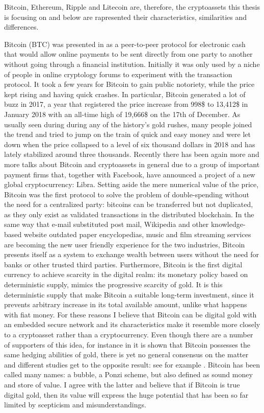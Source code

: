 Bitcoin, Ethereum, Ripple and Litecoin are, therefore, the cryptoassets this thesis is focusing on and below are rapresented their characteristics, similarities and differences.
\bigskip

Bitcoin (BTC) was presented in \citep{BTC2008} as a peer-to-peer protocol for electronic cash that would allow online payments to be sent directly from one party to another without going through a financial institution. Initially it was only used by a niche of people in online cryptology forums to experiment with the transaction protocol. It took a few years for Bitcoin to gain public notoriety, while the price kept rising and having quick crashes.
In particular, Bitcoin generated a lot of buzz in 2017, a year that registered the price increase from 998\$ to 13,412\$ in January 2018 with an all-time high of 19,666\$ on the 17th of December. As usually seen during during any of the history's gold rushes, many people joined the trend and tried to jump on the train of quick and easy money and were let down when the price collapsed to a level of six thousand dollars in 2018 and has lately stabilized around three thousands.
Recently there has been again more and more talks about Bitcoin and cryptoassets in general due to a group of important payment firms that, together with Facebook, have announced a project of a new global cryptocurrency: Libra. Setting aside the mere numerical value of the price, Bitcoin was the first protocol to solve the problem of double-spending without the need for a centralized party: bitcoins can be transferred but not duplicated, as they only exist as validated transactions in the distributed blockchain. In the same way that e-mail substituted post mail, Wikipedia and other knowledge-based website outdated paper encyclopedias, music and film streaming services are becoming the new user friendly experience for the two industries, Bitcoin presents itself as a system to exchange wealth between users without the need for banks or other trusted third parties.
Furthermore, Bitcoin is the first digital currency to achieve scarcity in the digital realm: its monetary policy based on deterministic supply, mimics the progressive scarcity of gold. It is this deterministic supply that make Bitcoin a suitable long-term investment, since it prevents arbitrary increase in its total available amount, unlike what happens with fiat money.
For these reasons I believe that Bitcoin can be digital gold with an embedded secure network and its characteristics make it resemble more closely to a cryptoasset rather than a cryptocurrency. Even though there are a number of supporters of this idea, for instance in \citep{digitalgold} it is shown that Bitcoin possesses the same hedging abilities of gold, there is yet no general consensus on the matter and different studies get to the opposite result: see for example \citep{klein}.
Bitcoin has been called many names: a bubble, a Ponzi scheme, but also defined as sound money and store of value. I agree with the latter and believe that if Bitcoin is true digital gold, then its value will express the huge potential that has been so far limited by scepticism and misunderstandings.

